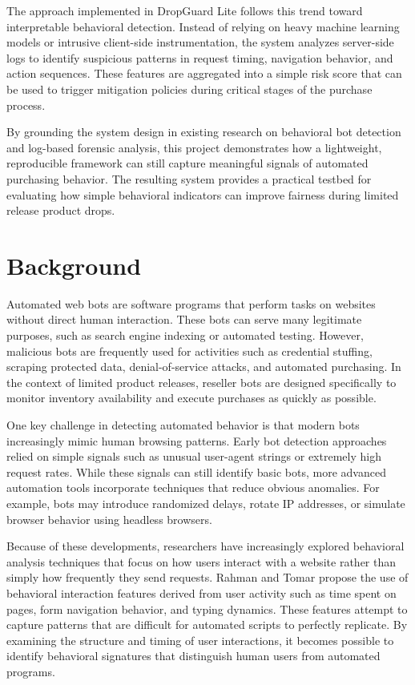 \documentclass[12pt]{article}
\begin{document}
The approach implemented in DropGuard Lite follows this trend toward interpretable behavioral detection. Instead of relying on heavy machine learning models or intrusive client-side instrumentation, the system analyzes server-side logs to identify suspicious patterns in request timing, navigation behavior, and action sequences. These features are aggregated into a simple risk score that can be used to trigger mitigation policies during critical stages of the purchase process.

By grounding the system design in existing research on behavioral bot detection and log-based forensic analysis, this project demonstrates how a lightweight, reproducible framework can still capture meaningful signals of automated purchasing behavior. The resulting system provides a practical testbed for evaluating how simple behavioral indicators can improve fairness during limited release product drops.

\section{Background}
Automated web bots are software programs that perform tasks on websites without direct human interaction. These bots can serve many legitimate purposes, such as search engine indexing or automated testing. However, malicious bots are frequently used for activities such as credential stuffing, scraping protected data, denial-of-service attacks, and automated purchasing. In the context of limited product releases, reseller bots are designed specifically to monitor inventory availability and execute purchases as quickly as possible.

One key challenge in detecting automated behavior is that modern bots increasingly mimic human browsing patterns. Early bot detection approaches relied on simple signals such as unusual user-agent strings or extremely high request rates. While these signals can still identify basic bots, more advanced automation tools incorporate techniques that reduce obvious anomalies. For example, bots may introduce randomized delays, rotate IP addresses, or simulate browser behavior using headless browsers.

Because of these developments, researchers have increasingly explored behavioral analysis techniques that focus on how users interact with a website rather than simply how frequently they send requests. Rahman and Tomar \cite{rahman2020new} propose the use of behavioral interaction features derived from user activity such as time spent on pages, form navigation behavior, and typing dynamics. These features attempt to capture patterns that are difficult for automated scripts to perfectly replicate. By examining the structure and timing of user interactions, it becomes possible to identify behavioral signatures that distinguish human users from automated programs.
\end{document}
